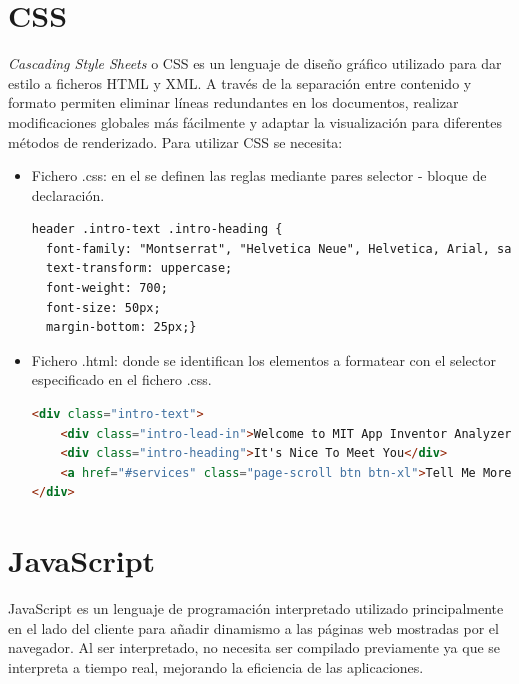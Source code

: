 \documentclass[a4paper, 12pt]{book}
\begin{document}
\section{CSS} 
\label{sec:seccion7}
\textit{Cascading Style Sheets} o CSS es un lenguaje de diseño gráfico utilizado para dar estilo a ficheros HTML y XML. A través de la separación entre contenido y formato permiten eliminar líneas redundantes en los documentos, realizar modificaciones globales más fácilmente y adaptar la visualización para diferentes métodos de renderizado. 
Para utilizar CSS se necesita:
 	\begin{itemize}	
		\item Fichero .css: en el se definen las reglas mediante pares selector - bloque de declaración.
		\begin{lstlisting}[language=HTML]
header .intro-text .intro-heading {
  font-family: "Montserrat", "Helvetica Neue", Helvetica, Arial, sans-serif;
  text-transform: uppercase;
  font-weight: 700;
  font-size: 50px;
  margin-bottom: 25px;}
		\end{lstlisting}
		\item Fichero .html: donde se identifican los elementos a formatear con el selector especificado en el fichero .css.
		\begin{lstlisting}[language=HTML]
<div class="intro-text">
	<div class="intro-lead-in">Welcome to MIT App Inventor Analyzer</div>
	<div class="intro-heading">It's Nice To Meet You</div>
	<a href="#services" class="page-scroll btn btn-xl">Tell Me More</a>
</div>
		\end{lstlisting}
	\end{itemize}
\section{JavaScript} 
\label{sec:seccion8}
JavaScript es un lenguaje de programación interpretado utilizado principalmente en el lado del cliente para añadir dinamismo a las páginas web mostradas por el navegador. Al ser interpretado, no necesita ser compilado previamente ya que se interpreta a tiempo real, mejorando la eficiencia de las aplicaciones. 
\end{document}
